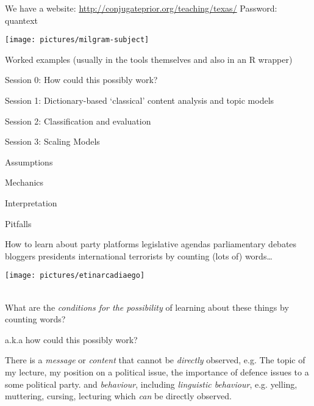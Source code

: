 \documentclass{mediumfoils}
\author{\textbf{Will Lowe}\\University of Mannheim}
\date{}
\begin{document}
\maketitle


We have a website:
\ita
\itm \url{http://conjugateprior.org/teaching/texas/}
\itm Password: quantext
\itz


\centerline{\texttt{[image: pictures/milgram-subject]}}

Worked examples (usually in the tools themselves and also in an R wrapper) 


Session 0: How could this possibly work?

Session 1: Dictionary-based `classical' content analysis and topic models

Session 2: Classification and evaluation

Session 3: Scaling Models



Assumptions

Mechanics

Interpretation

Pitfalls


%

\newpage

How to learn about
\ita
\itm party platforms
\itm legislative agendas
\itm parliamentary debates
\itm bloggers
\itm presidents
\itm international terrorists
\itz
by counting (lots of) words\ldots


\centerline{\texttt{[image: pictures/etinarcadiaego]}}

~\\
What are the \textit{conditions for the possibility} of learning about these things by counting words?

\vfill
a.k.a how could this possibly work?


There is a \textsl{message} or \textit{content} that cannot be \textit{directly} observed, e.g. 
\ita 
\itm The topic of my lecture, my position on a political issue, the importance of defence issues to a some political party.
\itz
 and \textit{behaviour}, including \textsl{linguistic behaviour}, e.g. 
\ita
\itm yelling, muttering, cursing, lecturing 
\itz
which \textit{can} be directly observed.
\end{document}
